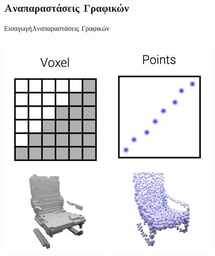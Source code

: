 \documentclass[10pt]{beamer}
\begin{document}
\subsection{Αναπαραστάσεις Γραφικών}
\begin{frame}{Εισαγωγή}{Αναπαραστάσεις Γραφικών}
\begin{columns}
    \includegraphics[height = .5\textheight]{images/voxels.jpg} 
    \includegraphics[height = .5\textheight]{images/points.jpg} 

\end{columns}
\end{frame}
\end{document}
